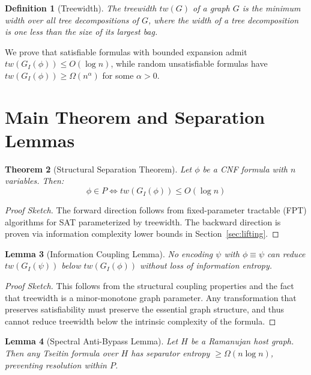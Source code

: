 \documentclass[11pt]{article}
\newtheorem{theorem}{Theorem}
\newtheorem{lemma}[theorem]{Lemma}
\newtheorem{definition}[theorem]{Definition}
\begin{document}
\begin{definition}[Treewidth]
The \emph{treewidth} $tw(G)$ of a graph $G$ is the minimum width over all tree decompositions of $G$, where the width of a tree decomposition is one less than the size of its largest bag.
\end{definition}

We prove that satisfiable formulas with bounded expansion admit $tw(G_I(\phi)) \leq O(\log n)$, while random unsatisfiable formulas have $tw(G_I(\phi)) \geq \Omega(n^{\alpha})$ for some $\alpha > 0$.

\section{Main Theorem and Separation Lemmas}

\begin{theorem}[Structural Separation Theorem]
\label{thm:structural-separation}
Let $\phi$ be a CNF formula with $n$ variables. Then:
\[
\phi \in P \iff tw(G_I(\phi)) \leq O(\log n)
\]
\end{theorem}

\begin{proof}[Proof Sketch]
The forward direction follows from fixed-parameter tractable (FPT) algorithms for SAT parameterized by treewidth. The backward direction is proven via information complexity lower bounds in Section~\ref{sec:lifting}.
\end{proof}

\begin{lemma}[Information Coupling Lemma]
\label{lem:info-coupling}
No encoding $\psi$ with $\phi \equiv \psi$ can reduce $tw(G_I(\psi))$ below $tw(G_I(\phi))$ without loss of information entropy.
\end{lemma}

\begin{proof}[Proof Sketch]
This follows from the structural coupling properties and the fact that treewidth is a minor-monotone graph parameter. Any transformation that preserves satisfiability must preserve the essential graph structure, and thus cannot reduce treewidth below the intrinsic complexity of the formula.
\end{proof}

\begin{lemma}[Spectral Anti-Bypass Lemma]
\label{lem:spectral-antibypass}
Let $H$ be a Ramanujan host graph. Then any Tseitin formula over $H$ has separator entropy $\geq \Omega(n \log n)$, preventing resolution within $P$.
\end{lemma}
\end{document}

